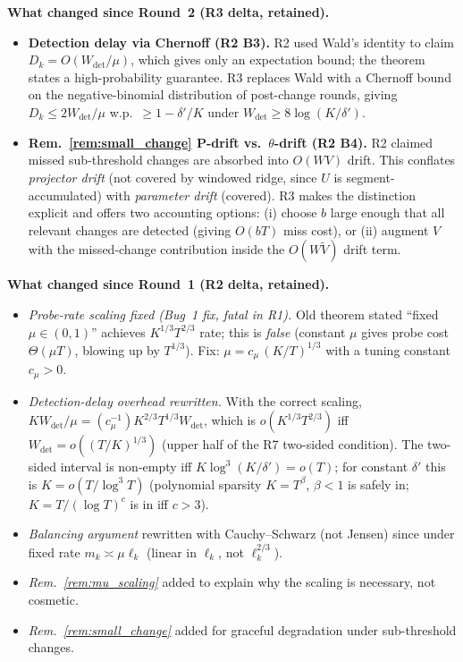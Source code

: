 \textbf{What changed since Round~2 (R3 delta, retained).}
\begin{itemize}[leftmargin=*,itemsep=1pt,topsep=1pt]
\item \textbf{Detection delay via Chernoff (R2 B3).} R2 used Wald's
identity to claim $D_k=O(W_{\mathrm{det}}/\mu)$, which gives only an
expectation bound; the theorem states a high-probability guarantee.
R3 replaces Wald with a Chernoff bound on the negative-binomial
distribution of post-change rounds, giving
$D_k\le 2W_{\mathrm{det}}/\mu$ w.p.\ $\ge 1-\delta'/K$ under
$W_{\mathrm{det}}\ge 8\log(K/\delta')$.
\item \textbf{Rem.~\ref{rem:small_change} P-drift vs.\ $\theta$-drift (R2 B4).}
R2 claimed missed sub-threshold changes are absorbed into
$O(WV)$ drift. This conflates \emph{projector drift} (not covered by
windowed ridge, since $\widehat U$ is segment-accumulated) with
\emph{parameter drift} (covered). R3 makes the distinction explicit
and offers two accounting options: (i) choose $b$ large enough that
all relevant changes are detected (giving $O(bT)$ miss cost), or
(ii) augment $V$ with the missed-change contribution inside the
$O(W\widetilde V)$ drift term.
\end{itemize}

\textbf{What changed since Round~1 (R2 delta, retained).}
\begin{itemize}[leftmargin=*,itemsep=1pt,topsep=1pt]
\item \emph{Probe-rate scaling fixed (Bug~1 fix, fatal in R1).} Old
theorem stated ``fixed $\mu\in(0,1)$'' achieves $K^{1/3}T^{2/3}$ rate;
this is \emph{false} (constant $\mu$ gives probe cost $\Theta(\mu T)$,
blowing up by $T^{1/3}$). Fix: $\mu = c_\mu\,(K/T)^{1/3}$ with a tuning
constant $c_\mu>0$.
\item \emph{Detection-delay overhead rewritten.} With the correct
scaling, $KW_{\mathrm{det}}/\mu = (c_\mu^{-1})K^{2/3}T^{1/3}W_{\mathrm{det}}$,
which is $o(K^{1/3}T^{2/3})$ iff $W_{\mathrm{det}}=o((T/K)^{1/3})$
(upper half of the R7 two-sided condition). The two-sided interval
is non-empty iff $K\log^3(K/\delta')=o(T)$; for constant $\delta'$
this is $K=o(T/\log^3 T)$ (polynomial sparsity $K=T^\beta$, $\beta<1$
is safely in; $K=T/(\log T)^c$ is in iff $c>3$).
\item \emph{Balancing argument} rewritten with Cauchy--Schwarz (not
Jensen) since under fixed rate $m_k\asymp\mu\ell_k$ (linear in $\ell_k$,
not $\ell_k^{2/3}$).
\item \emph{Rem.~\ref{rem:mu_scaling}} added to explain why the scaling
is necessary, not cosmetic.
\item \emph{Rem.~\ref{rem:small_change}} added for graceful degradation
under sub-threshold changes.
\end{itemize}

